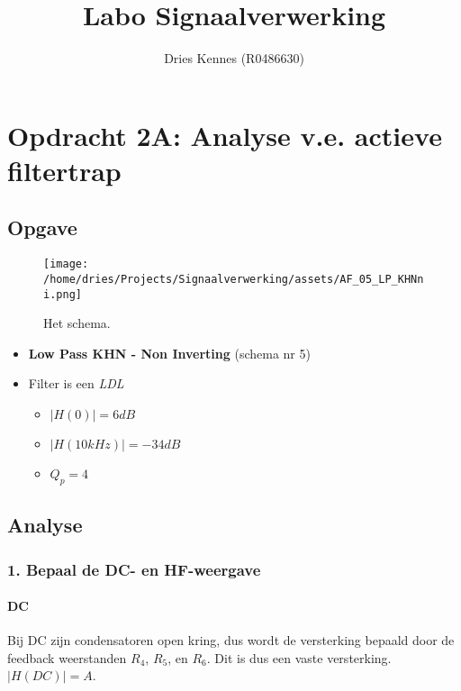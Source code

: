 \documentclass[]{article}
\title{Labo Signaalverwerking}
\author{Dries Kennes (R0486630)}
\date{}
\let\oldparagraph\paragraph
\renewcommand{\paragraph}[1]{\oldparagraph{#1}\mbox{}}
\begin{document}
\maketitle

\hypertarget{header-n5299}{%
\section{Opdracht 2A: Analyse v.e. actieve
filtertrap}\label{header-n5299}}

\hypertarget{header-n5300}{%
\subsection{Opgave}\label{header-n5300}}

\begin{figure}
\centering
\texttt{[image: /home/dries/Projects/Signaalverwerking/assets/AF\_05\_LP\_KHNni.png]}
\caption{Het schema.}
\end{figure}

\begin{itemize}
\item
  \textbf{Low Pass KHN - Non Inverting} (schema nr 5)
\item
  Filter is een \emph{LDL}

  \begin{itemize}
  \item
    \(|H(0)| = 6dB\)
  \item
    \(|H(10 kHz)| = -34dB\)
  \item
    \(Q_p = 4\)
  \end{itemize}
\end{itemize}

\hypertarget{header-n5320}{%
\subsection{Analyse}\label{header-n5320}}

\hypertarget{header-n5321}{%
\subsubsection{1. Bepaal de DC- en HF-weergave}\label{header-n5321}}

\hypertarget{header-n5322}{%
\paragraph{DC}\label{header-n5322}}

Bij DC zijn condensatoren open kring, dus wordt de versterking bepaald
door de feedback weerstanden \(R_4\), \(R_5\), en \(R_6\). Dit is dus
een vaste versterking. \(|H(DC)| = A\).
\end{document}
